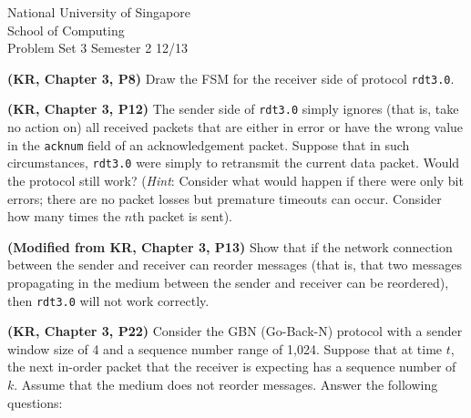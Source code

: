 \documentclass[a4paper,11pt]{exam}
\begin{document}
    \extraheadheight{.5in}
    {\large\sf National University of Singapore\\ School of Computing \\
    \LARGE\sf Problem Set 3}%
    {\large\sf Semester 2 12/13}
    \firstpageheadrule
    \pagestyle{headandfoot}

    \begin{questions}
	\question \textbf{(KR, Chapter 3, P8)} 
	Draw the FSM for the receiver side of protocol \texttt{rdt3.0}.

	\question \textbf{(KR, Chapter 3, P12)} 
	The sender side of \texttt{rdt3.0} simply ignores (that 
	is, take no action on) all received packets that are either 
	in error or have the wrong value in the \texttt{acknum} 
	field of an acknowledgement packet.  Suppose that in such 
	circumstances, \texttt{rdt3.0} were simply to retransmit 
	the current data packet.  Would the protocol still work?  
	(\textit{Hint}: Consider what would happen if there were 
	only bit errors; there are no packet losses but premature 
	timeouts can occur.  Consider how many times the $n$th packet 
	is sent).

	\question \textbf{(Modified from KR, Chapter 3, P13)} 
	Show that if the network connection between the sender and 
	receiver can reorder messages (that is, that two messages 
	propagating in the medium between the sender and receiver 
	can be reordered), then \texttt{rdt3.0} will not work correctly.  

%	

	\question \textbf{(KR, Chapter 3, P22)} 
	Consider the GBN (Go-Back-N) protocol with a sender window size of 4 and a sequence
	number range of 1,024. Suppose that at time $t$, the next in-order packet
	that the receiver is expecting has a sequence number of $k$. Assume that the
	medium does not reorder messages. Answer the following questions:
\end{questions}
\end{document}
